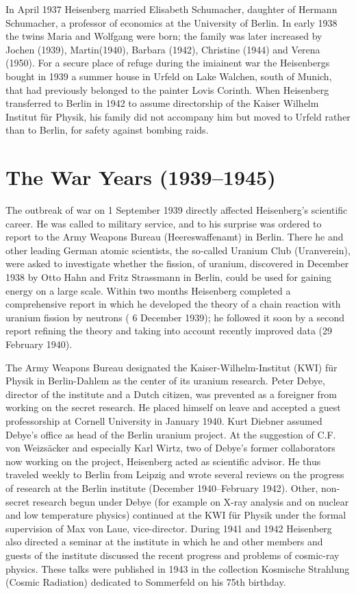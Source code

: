 \documentclass{article}
\begin{document}
In April 1937 Heisenberg married Elisabeth Schumacher, daughter of Hermann Schumacher, a professor of economics at the University of Berlin. In early 1938 the twins Maria and Wolfgang were born; the family was later increased by Jochen (1939), Martin(1940), Barbara (1942), Christine (1944) and Verena (1950). For a secure place of refuge during the imiainent war the Heisenbergs bought in 1939 a summer house in Urfeld on Lake Walchen, south of Munich, that had previously belonged to the painter Lovis Corinth. When Heisenberg transferred to Berlin in 1942 to assume directorship of the Kaiser Wilhelm Institut für Physik, his family did not accompany him but moved to Urfeld rather than to Berlin, for safety against bombing raids.

\section{The War Years (1939--1945)}

The outbreak of war on 1 September 1939 directly affected Heisenberg's scientific career. He was called to military service, and to his surprise was ordered to report to the Army Weapons Bureau (Heereswaffenamt) in Berlin. There he and other leading German atomic scientists, the so-called Uranium Club (Uranverein), were asked to investigate whether the fission, of uranium, discovered in December 1938 by Otto Hahn and Fritz Strassmann in Berlin, could be used for gaining energy on a large scale. Within two months Heisenberg completed a comprehensive report in which he developed the theory of a chain reaction with uranium fission by neutrons ( 6 December 1939); he followed it soon by a second report refining the theory and taking into account recently improved data (29 February 1940).

The Army Weapons Bureau designated the Kaiser-Wilhelm-Institut (KWI) für Physik in Berlin-Dahlem as the center of its uranium research. Peter Debye, director of the institute and a Dutch citizen, was prevented as a foreigner from working on the secret research. He placed himself on leave and accepted a guest professorship at Cornell University in January 1940. Kurt Diebner assumed Debye's office as head of the Berlin uranium project. At the suggestion of C.F. von Weizsäcker and especially Karl Wirtz, two of Debye's former collaborators now working on the project, Heisenberg acted as scientific advisor. He thus traveled weekly to Berlin from Leipzig and wrote several reviews on the progress of research at the Berlin institute (December 1940--February 1942). Other, non-secret research begun under Debye (for example on X-ray analysis and on nuclear and low temperature physics) continued at the KWI für Physik under the formal supervision of Max von Laue, vice-director. During 1941 and 1942 Heisenberg also directed a seminar at the institute in which he and other members and guests of the institute discussed the recent progress and problems of cosmic-ray physics. These talks were published in 1943 in the collection Kosmische Strahlung (Cosmic Radiation) dedicated to Sommerfeld on his 75th birthday.
\end{document}
